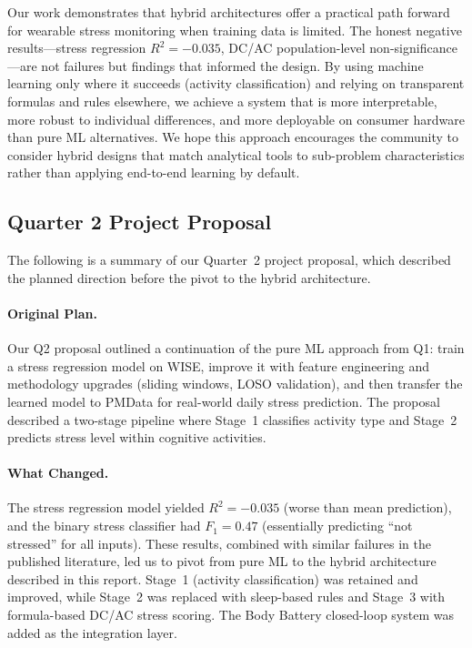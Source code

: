 \documentclass[12pt,letterpaper]{article}
\begin{document}
Our work demonstrates that hybrid architectures offer a practical path forward for wearable stress monitoring when training data is limited. The honest negative results---stress regression $R^2 = -0.035$, DC/AC population-level non-significance---are not failures but findings that informed the design. By using machine learning only where it succeeds (activity classification) and relying on transparent formulas and rules elsewhere, we achieve a system that is more interpretable, more robust to individual differences, and more deployable on consumer hardware than pure ML alternatives. We hope this approach encourages the community to consider hybrid designs that match analytical tools to sub-problem characteristics rather than applying end-to-end learning by default.



\clearpage




\clearpage
\makeappendix

\subsection{Quarter 2 Project Proposal}

The following is a summary of our Quarter~2 project proposal, which described the planned direction before the pivot to the hybrid architecture.

\paragraph{Original Plan.}
Our Q2 proposal outlined a continuation of the pure ML approach from Q1: train a stress regression model on WISE, improve it with feature engineering and methodology upgrades (sliding windows, LOSO validation), and then transfer the learned model to PMData for real-world daily stress prediction. The proposal described a two-stage pipeline where Stage~1 classifies activity type and Stage~2 predicts stress level within cognitive activities.

\paragraph{What Changed.}
The stress regression model yielded $R^2 = -0.035$ (worse than mean prediction), and the binary stress classifier had $F_1 = 0.47$ (essentially predicting ``not stressed'' for all inputs). These results, combined with similar failures in the published literature, led us to pivot from pure ML to the hybrid architecture described in this report. Stage~1 (activity classification) was retained and improved, while Stage~2 was replaced with sleep-based rules and Stage~3 with formula-based DC/AC stress scoring. The Body Battery closed-loop system was added as the integration layer.
\end{document}
